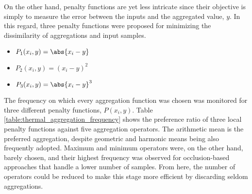 On the other hand, penalty functions are yet less intricate since their objective is simply to measure the error between the inputs and the aggregated value, $y$. In this regard, three penalty functions \cite{paternain_color_2012} were proposed for minimizing the dissimilarity of aggregations and input samples. 
\begin{itemize}
    \setlength\itemsep{0.5em}
    \item $P_1(x_i, y) = \abs{x_i - y}$
    \item $P_2(x_i, y) = (x_i - y)^2$
    \item $P_3(x_i, y) = \abs{x_i - y}^3$
\end{itemize}

The frequency on which every aggregation function was chosen was monitored for three different penalty functions, $P(x_i, y)$. Table \ref{table:thermal_aggregation_frequency} shows the preference ratio of three local penalty functions against five aggregation operators. The arithmetic mean is the preferred aggregation, despite geometric and harmonic means being also frequently adopted. Maximum and minimum operators were, on the other hand, barely chosen, and their highest frequency was observed for occlusion-based approaches that handle a lower number of samples. From here, the number of operators could be reduced to make this stage more efficient by discarding seldom aggregations.

